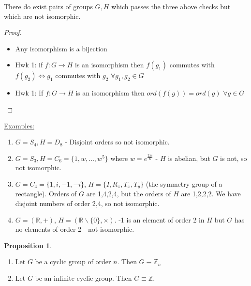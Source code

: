 \documentclass{article}
\theoremstyle{definition}
\newtheorem{proposition}[theorem]{Proposition}
\begin{document}
There do exist pairs of groups $G, H$ which passes the three above checks but which are not isomorphic.

\begin{proof}
  \begin{itemize}
    \item Any isomorphism is a bijection
    \item Hwk 1: 
      if $f : G \rightarrow H$ is an isomorphism then $f(g_1)$ commutes with $f(g_2) \iff g_1$ commutes with $g_2$ $\forall g_1,g_2 \in G$
    \item Hwk 1: 
      If $f:G\rightarrow H$ is an isomorphism then $ord(f(g))=ord(g)$ $\forall g\in G$
  \end{itemize}
\end{proof}

\underline{Examples:}
\begin{enumerate}
  \item $G=S_4, H=D_8$ - Disjoint orders so not isomorphic.
  \item $G=S_3, H=C_6=\{1,w,\ldots,w^5\}$ where $w=e^{\frac{2 \pi i}{6}}$ - $H$ is abelian, but $G$ is not, so not isomorphic.
  \item $G=C_4=\{1,i,-1,-i\}$, $H=\{I,R_\pi,T_x,T_y\}$ (the symmetry group of a rectangle). Orders of $G$ are 1,4,2,4, but the orders of $H$ are 1,2,2,2. We have disjoint numbers of order 2,4, so not isomorphic.
  \item $G=(\mathbb{R}, +)$, $H=(\mathbb{R}\backslash\{0\}, \times).$ -1 is an element of order 2 in $H$ but $G$ has no elements of order 2 - not isomorphic.
\end{enumerate}

\begin{proposition}
  \begin{enumerate}
    \item Let $G$ be a cyclic group of order $n$. Then $G \equiv \mathbb{Z}_n$
    \item Let $G$ be an infinite cyclic group. Then $G \equiv \mathbb{Z}$.
  \end{enumerate}
\end{proposition}
\end{document}
